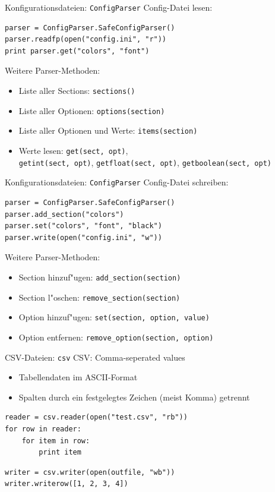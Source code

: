 \begin{frame}[fragile]{Konfigurationsdateien: \texttt{ConfigParser}}
Config-Datei lesen:
\begin{lstlisting}[style=Python]
parser = ConfigParser.SafeConfigParser()
parser.readfp(open("config.ini", "r"))
print parser.get("colors", "font")
\end{lstlisting}
Weitere Parser-Methoden:
\begin{itemize}
\item Liste aller Sections: \texttt{sections()}
\item Liste aller Optionen: \texttt{options(section)}
\item Liste aller Optionen und Werte: \texttt{items(section)}
\item Werte lesen: \texttt{get(sect, opt)}, \\
\texttt{getint(sect, opt)}, \texttt{getfloat(sect, opt)}, \texttt{getboolean(sect, opt)}
\end{itemize}
\end{frame}

\begin{frame}[fragile]{Konfigurationsdateien: \texttt{ConfigParser}}
Config-Datei schreiben:
\begin{lstlisting}[style=Python]
parser = ConfigParser.SafeConfigParser()
parser.add_section("colors")
parser.set("colors", "font", "black")
parser.write(open("config.ini", "w"))
\end{lstlisting}
Weitere Parser-Methoden:
\begin{itemize}
\item Section hinzuf"ugen: \texttt{add\_section(section)}
\item Section l"oschen: \texttt{remove\_section(section)}
\item Option hinzuf"ugen: \texttt{set(section, option, value)}
\item Option entfernen: \texttt{remove\_option(section, option)}
\end{itemize}
\end{frame}

\begin{frame}[fragile]{CSV-Dateien: \texttt{csv}}
CSV: Comma-seperated values
\begin{itemize}
\item Tabellendaten im ASCII-Format
\item Spalten durch ein festgelegtes Zeichen (meist Komma) getrennt
\end{itemize}
\begin{lstlisting}[style=Python]
reader = csv.reader(open("test.csv", "rb"))
for row in reader:
    for item in row: 
        print item
\end{lstlisting}
\begin{lstlisting}[style=Python]
writer = csv.writer(open(outfile, "wb"))
writer.writerow([1, 2, 3, 4])
\end{lstlisting}
\end{frame}

